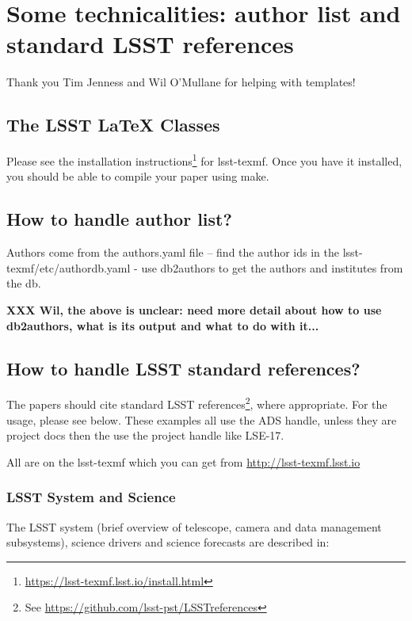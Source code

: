 \section{Some technicalities: author list and standard LSST references} 

Thank you Tim Jenness and Wil O'Mullane for helping with templates! 

\subsection{The LSST LaTeX Classes}

Please see the installation instructions\footnote{\url{https://lsst-texmf.lsst.io/install.html}} 
for lsst-texmf. Once you have it installed, you should be able to compile your paper
using make. 

\subsection{How to handle author list?} 

Authors come from the authors.yaml file --  find the author ids in the lsst-texmf/etc/authordb.yaml - use db2authors to get the authors and institutes from the db. 

{\bf XXX Wil, the above is unclear: need more detail about how to use db2authors,
what is its output and what to do with it...} 


\subsection{How to handle LSST standard references?} 

The papers should cite standard LSST references\footnote{See \url{https://github.com/lsst-pst/LSSTreferences}}, 
where appropriate. For the usage, please see below.  These examples all use the ADS handle, unless they are 
project docs then the use the project handle like LSE-17.

All are on the lsst-texmf which you can get from \url{http://lsst-texmf.lsst.io}


\subsubsection{LSST System and Science}

The LSST system (brief overview of telescope, camera and data management subsystems),
science drivers and science forecasts are described in:

